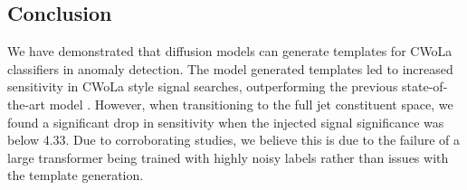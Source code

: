 \subsection{Conclusion}

We have demonstrated that diffusion models can generate templates for CWoLa classifiers in anomaly detection.
The \drapes model generated templates led to increased sensitivity in CWoLa style signal searches, outperforming the previous state-of-the-art model \FfF.
However, when transitioning to the full jet constituent space, we found a significant drop in sensitivity when the injected signal significance was below 4.33.
Due to corroborating studies, we believe this is due to the failure of a large transformer being trained with highly noisy labels rather than issues with the template generation.
